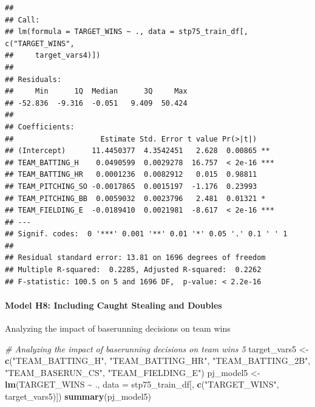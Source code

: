 \documentclass[
]{article}
\newenvironment{Shaded}{\begin{snugshade}}{\end{snugshade}}
\newcommand{\AttributeTok}[1]{\textcolor[rgb]{0.13,0.29,0.53}{#1}}
\newcommand{\CommentTok}[1]{\textcolor[rgb]{0.56,0.35,0.01}{\textit{#1}}}
\newcommand{\FunctionTok}[1]{\textcolor[rgb]{0.13,0.29,0.53}{\textbf{#1}}}
\newcommand{\NormalTok}[1]{#1}
\newcommand{\OtherTok}[1]{\textcolor[rgb]{0.56,0.35,0.01}{#1}}
\newcommand{\SpecialCharTok}[1]{\textcolor[rgb]{0.81,0.36,0.00}{\textbf{#1}}}
\newcommand{\StringTok}[1]{\textcolor[rgb]{0.31,0.60,0.02}{#1}}
\begin{document}
\begin{verbatim}
## 
## Call:
## lm(formula = TARGET_WINS ~ ., data = stp75_train_df[, c("TARGET_WINS", 
##     target_vars4)])
## 
## Residuals:
##     Min      1Q  Median      3Q     Max 
## -52.836  -9.316  -0.051   9.409  50.424 
## 
## Coefficients:
##                    Estimate Std. Error t value Pr(>|t|)    
## (Intercept)      11.4450377  4.3542451   2.628  0.00865 ** 
## TEAM_BATTING_H    0.0490599  0.0029278  16.757  < 2e-16 ***
## TEAM_BATTING_HR   0.0001236  0.0082912   0.015  0.98811    
## TEAM_PITCHING_SO -0.0017865  0.0015197  -1.176  0.23993    
## TEAM_PITCHING_BB  0.0059032  0.0023796   2.481  0.01321 *  
## TEAM_FIELDING_E  -0.0189410  0.0021981  -8.617  < 2e-16 ***
## ---
## Signif. codes:  0 '***' 0.001 '**' 0.01 '*' 0.05 '.' 0.1 ' ' 1
## 
## Residual standard error: 13.81 on 1696 degrees of freedom
## Multiple R-squared:  0.2285, Adjusted R-squared:  0.2262 
## F-statistic: 100.5 on 5 and 1696 DF,  p-value: < 2.2e-16
\end{verbatim}

\paragraph{Model H8: Including Caught Stealing and
Doubles}\label{model-h8-including-caught-stealing-and-doubles}

Analyzing the impact of baserunning decisions on team wins

\begin{Shaded}
\begin{Highlighting}[]
\CommentTok{\# Analyzing the impact of baserunning decisions on team wins 5}
\NormalTok{target\_vars5 }\OtherTok{\textless{}{-}} \FunctionTok{c}\NormalTok{(}\StringTok{"TEAM\_BATTING\_H"}\NormalTok{, }\StringTok{"TEAM\_BATTING\_HR"}\NormalTok{, }\StringTok{"TEAM\_BATTING\_2B"}\NormalTok{, }\StringTok{"TEAM\_BASERUN\_CS"}\NormalTok{, }\StringTok{"TEAM\_FIELDING\_E"}\NormalTok{)}
\NormalTok{pj\_model5 }\OtherTok{\textless{}{-}} \FunctionTok{lm}\NormalTok{(TARGET\_WINS }\SpecialCharTok{\textasciitilde{}}\NormalTok{ ., }\AttributeTok{data =}\NormalTok{ stp75\_train\_df[, }\FunctionTok{c}\NormalTok{(}\StringTok{"TARGET\_WINS"}\NormalTok{, target\_vars5)])}
\FunctionTok{summary}\NormalTok{(pj\_model5)}
\end{Highlighting}
\end{Shaded}
\end{document}
